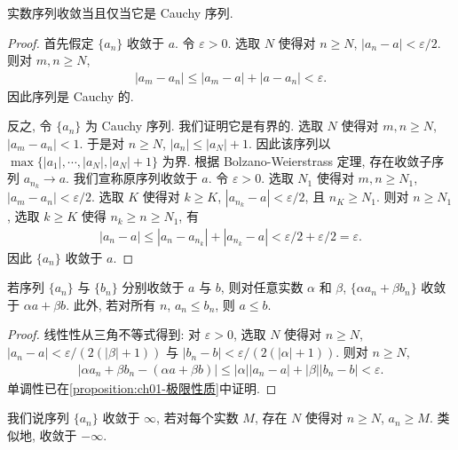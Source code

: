 \documentclass[../../main.tex]{subfiles}
\begin{document}
\begin{theorem}\label{theorem:ch01-Cauchy}
实数序列收敛当且仅当它是 Cauchy 序列.
\end{theorem}

\begin{proof}
首先假定 $\{a_{n}\}$ 收敛于 $a$. 令 $\varepsilon>0$. 选取 $N$ 使得对 $n\geqslant N$, $|a_{n}-a|<\varepsilon/2$. 则对 $m,n\geqslant N$,
\begin{align*}
|a_{m}-a_{n}|\leqslant|a_{m}-a|+|a-a_{n}|<\varepsilon.
\end{align*}
因此序列是 Cauchy 的.

反之, 令 $\{a_{n}\}$ 为 Cauchy 序列. 我们证明它是有界的. 选取 $N$ 使得对 $m,n\geqslant N$, $|a_{m}-a_{n}|<1$. 于是对 $n\geqslant N$, $|a_{n}|\leqslant|a_{N}|+1$. 因此该序列以 $\max\{|a_{1}|,\cdots,|a_{N}|,|a_{N}|+1\}$ 为界. 根据 Bolzano-Weierstrass 定理, 存在收敛子序列 $a_{n_{k}}\to a$. 我们宣称原序列收敛于 $a$. 令 $\varepsilon>0$. 选取 $N_{1}$ 使得对 $m,n\geqslant N_{1}$, $|a_{m}-a_{n}|<\varepsilon/2$. 选取 $K$ 使得对 $k\geqslant K$, $|a_{n_{k}}-a|<\varepsilon/2$, 且 $n_{K}\geqslant N_{1}$. 则对 $n\geqslant N_{1}$, 选取 $k\geqslant K$ 使得 $n_{k}\geqslant n\geqslant N_{1}$, 有
\begin{align*}
|a_{n}-a|\leqslant|a_{n}-a_{n_{k}}|+|a_{n_{k}}-a|<\varepsilon/2+\varepsilon/2=\varepsilon.
\end{align*}
因此 $\{a_{n}\}$ 收敛于 $a$.
\end{proof}

\begin{theorem}\label{theorem:ch01-线性单调}
若序列 $\{a_{n}\}$ 与 $\{b_{n}\}$ 分别收敛于 $a$ 与 $b$, 则对任意实数 $\alpha$ 和 $\beta$, $\{\alpha a_{n}+\beta b_{n}\}$ 收敛于 $\alpha a+\beta b$. 此外, 若对所有 $n$, $a_{n}\leqslant b_{n}$, 则 $a\leqslant b$.
\end{theorem}

\begin{proof}
线性性从三角不等式得到: 对 $\varepsilon>0$, 选取 $N$ 使得对 $n\geqslant N$, $|a_{n}-a|<\varepsilon/(2(|\beta|+1))$ 与 $|b_{n}-b|<\varepsilon/(2(|\alpha|+1))$. 则对 $n\geqslant N$,
\begin{align*}
|\alpha a_{n}+\beta b_{n}-(\alpha a+\beta b)|\leqslant|\alpha||a_{n}-a|+|\beta||b_{n}-b|<\varepsilon.
\end{align*}
单调性已在\cref{proposition:ch01-极限性质}中证明.
\end{proof}

我们说序列 $\{a_{n}\}$ 收敛于 $\infty$, 若对每个实数 $M$, 存在 $N$ 使得对 $n\geqslant N$, $a_{n}\geqslant M$. 类似地, 收敛于 $-\infty$.
\end{document}
